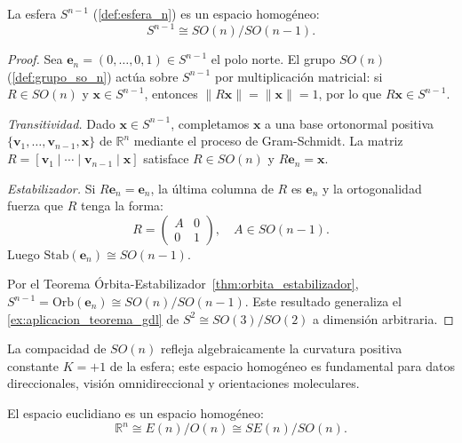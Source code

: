 \begin{proposition}\label{prop:esfera_cociente}
La esfera $S^{n-1}$ (\autoref{def:esfera_n}) es un espacio homogéneo:
\[
S^{n-1} \cong SO(n)/SO(n-1).
\]
\end{proposition}

\begin{proof}
Sea $\mathbf{e}_n = (0,\ldots,0,1) \in S^{n-1}$ el polo norte. El grupo $SO(n)$ (\autoref{def:grupo_so_n}) actúa sobre $S^{n-1}$ por multiplicación matricial: si $R \in SO(n)$ y $\mathbf{x} \in S^{n-1}$, entonces $\|R\mathbf{x}\| = \|\mathbf{x}\| = 1$, por lo que $R\mathbf{x} \in S^{n-1}$.

\textit{Transitividad.} Dado $\mathbf{x} \in S^{n-1}$, completamos $\mathbf{x}$ a una base ortonormal positiva $\{\mathbf{v}_1, \ldots, \mathbf{v}_{n-1}, \mathbf{x}\}$ de $\mathbb{R}^n$ mediante el proceso de Gram-Schmidt. La matriz $R = [\mathbf{v}_1 \mid \cdots \mid \mathbf{v}_{n-1} \mid \mathbf{x}]$ satisface $R \in SO(n)$ y $R\mathbf{e}_n = \mathbf{x}$.

\textit{Estabilizador.} Si $R\mathbf{e}_n = \mathbf{e}_n$, la última columna de $R$ es $\mathbf{e}_n$ y la ortogonalidad fuerza que $R$ tenga la forma:
\[
R = \begin{pmatrix} A & 0 \\ 0 & 1 \end{pmatrix}, \quad A \in SO(n-1).
\]
Luego $\mathrm{Stab}(\mathbf{e}_n) \cong SO(n-1)$.

Por el Teorema Órbita-Estabilizador~\ref{thm:orbita_estabilizador}, $S^{n-1} = \mathrm{Orb}(\mathbf{e}_n) \cong SO(n)/SO(n-1)$. Este resultado generaliza el \autoref{ex:aplicacion_teorema_gdl} de $S^2 \cong SO(3)/SO(2)$ a dimensión arbitraria.
\end{proof}

La compacidad de $SO(n)$ refleja algebraicamente la curvatura positiva constante $K=+1$ de la esfera; este espacio homogéneo es fundamental para datos direccionales, visión omnidireccional y orientaciones moleculares.

\begin{proposition}\label{prop:euclidiano_cociente}
El espacio euclidiano es un espacio homogéneo:
\[
\mathbb{R}^n \cong E(n)/O(n) \cong SE(n)/SO(n).
\]
\end{proposition}

